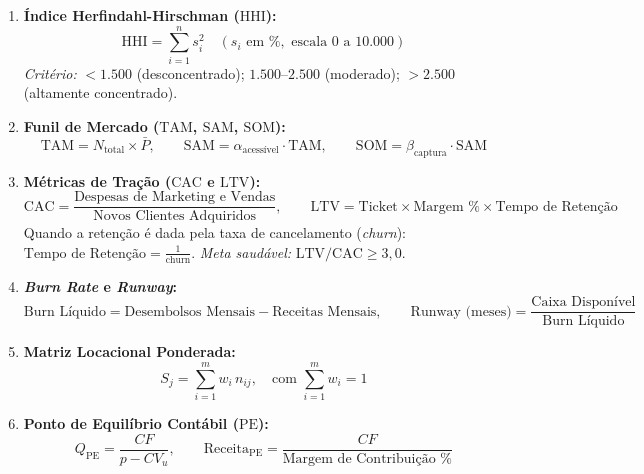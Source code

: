 \begin{boxFormula}
\begin{enumerate}[leftmargin=1.5em, itemsep=4pt]
  \item \textbf{Índice Herfindahl-Hirschman ($\text{HHI}$):}
  \[
  \text{HHI} = \sum_{i=1}^{n} s_i^2 \quad (s_i \text{ em } \%, \text{ escala } 0 \text{ a } 10.000)
  \]
  \textit{Critério:} $<1.500$ (desconcentrado); $1.500$–$2.500$ (moderado); $>2.500$ (altamente concentrado).

  \item \textbf{Funil de Mercado ($\text{TAM}$, $\text{SAM}$, $\text{SOM}$):}
  \[
  \text{TAM} = N_{\text{total}} \times \bar{P}, \qquad \text{SAM} = \alpha_{\text{acessível}} \cdot \text{TAM}, \qquad \text{SOM} = \beta_{\text{captura}} \cdot \text{SAM}
  \]

  \item \textbf{Métricas de Tração ($\text{CAC}$ e $\text{LTV}$):}
  \[
  \text{CAC} = \frac{\text{Despesas de Marketing e Vendas}}{\text{Novos Clientes Adquiridos}}, \qquad \text{LTV} = \text{Ticket} \times \text{Margem \%} \times \text{Tempo de Retenção}
  \]
  Quando a retenção é dada pela taxa de cancelamento (\textit{churn}): $\text{Tempo de Retenção} = \frac{1}{\text{churn}}$. \textit{Meta saudável:} $\text{LTV/CAC} \ge 3{,}0$.

  \item \textbf{\textit{Burn Rate} e \textit{Runway}:}
  \[
  \text{Burn Líquido} = \text{Desembolsos Mensais} - \text{Receitas Mensais}, \qquad \text{Runway (meses)} = \frac{\text{Caixa Disponível}}{\text{Burn Líquido}}
  \]

  \item \textbf{Matriz Locacional Ponderada:}
  \[
  S_j = \sum_{i=1}^{m} w_i\,n_{ij}, \quad \text{com } \sum_{i=1}^{m} w_i = 1
  \]

  \item \textbf{Ponto de Equilíbrio Contábil ($\text{PE}$):}
  \[
  Q_{\text{PE}} = \frac{CF}{p - CV_u}, \qquad \text{Receita}_{\text{PE}} = \frac{CF}{\text{Margem de Contribuição \%}}
  \]
\end{enumerate}
\end{boxFormula}

